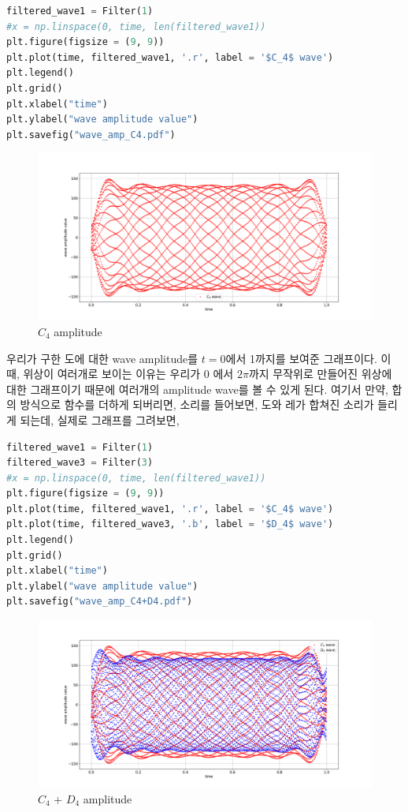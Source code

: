 \documentclass[11pt]{article}
\begin{document}
\begin{lstlisting}[language=Python]
filtered_wave1 = Filter(1)
#x = np.linspace(0, time, len(filtered_wave1))
plt.figure(figsize = (9, 9))
plt.plot(time, filtered_wave1, '.r', label = '$C_4$ wave')
plt.legend()
plt.grid()
plt.xlabel("time")
plt.ylabel("wave amplitude value")
plt.savefig("wave_amp_C4.pdf")
\end{lstlisting}

\begin{figure}[!ht]
  \centering
  \includegraphics[width=1\textwidth]{wave_amp_C4.pdf}
  \caption{$C_{4}$ amplitude}
\end{figure}



우리가 구한 도에 대한 wave amplitude를 $t=0$에서 1까지를 보여준 그래프이다. 이때, 위상이 여러개로 보이는 이유는 우리가 0 에서 $2\pi$까지 무작위로 만들어진 위상에 대한 그래프이기 때문에 여러개의 amplitude wave를 볼 수 있게 된다. 여기서 만약, 합의 방식으로 함수를 더하게 되버리면, 소리를 들어보면, 도와 레가 합쳐진 소리가 들리게 되는데, 실제로 그래프를 그려보면,

\begin{lstlisting}[language=Python]
filtered_wave1 = Filter(1)
filtered_wave3 = Filter(3)
#x = np.linspace(0, time, len(filtered_wave1))
plt.figure(figsize = (9, 9))
plt.plot(time, filtered_wave1, '.r', label = '$C_4$ wave')
plt.plot(time, filtered_wave3, '.b', label = '$D_4$ wave')
plt.legend()
plt.grid()
plt.xlabel("time")
plt.ylabel("wave amplitude value")
plt.savefig("wave_amp_C4+D4.pdf")
\end{lstlisting}

\begin{figure}[!ht]
  \centering
  \includegraphics[width=1\textwidth]{wave_amp_C4+D4.pdf}
  \caption{$C_{4}$ + $D_{4}$ amplitude}
\end{figure}
\end{document}
